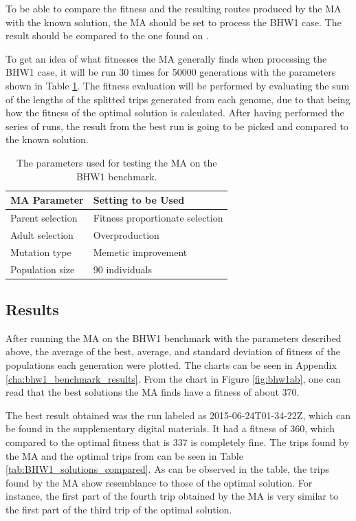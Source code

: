 To be able to compare the fitness and the resulting routes produced by the MA with the known solution, the MA should be set to process the BHW1 case. The result should be compared to the one found on \citet{BHW1Solution}.

To get an idea of what fitnesses the MA generally finds when processing the BHW1 case, it will be run 30 times for 50000 generations with the parameters shown in Table \ref{tab:BHW1_params_table}. The fitness evaluation will be performed by evaluating the sum of the lengths of the splitted trips generated from each genome, due to that being how the fitness of the optimal solution is calculated. After having performed the series of runs, the result from the best run is going to be picked and compared to the known solution.

{
\begin{table}[tbph]
\centering
\begin{tabular}{ll}
\toprule
\textbf{MA Parameter} & \textbf{Setting to be Used}     \\ \midrule
Parent selection      & Fitness proportionate selection \\
Adult selection       & Overproduction                  \\
Mutation type         & Memetic improvement             \\
Population size       & 90 individuals                  \\ \bottomrule
\end{tabular}
\caption{The parameters used for testing the MA on the BHW1 benchmark.}
\label{tab:BHW1_params_table}
\end{table}
}

\subsection{Results}

After running the MA on the BHW1 benchmark with the parameters described above, the average of the best, average, and standard deviation of fitness of the populations each generation were plotted. The charts can be seen in Appendix \ref{cha:bhw1_benchmark_results}. From the chart in Figure \ref{fig:bhw1ab}, one can read that the best solutions the MA finds have a fitness of about 370.

The best result obtained was the run labeled as 2015-06-24T01-34-22Z, which can be found in the supplementary digital materials. It had a fitness of 360, which compared to the optimal fitness that is 337 is completely fine. The trips found by the MA and the optimal trips from \citet{BHW1Solution} can be seen in Table \ref{tab:BHW1_solutions_compared}. As can be observed in the table, the trips found by the MA show resemblance to those of the optimal solution. For instance, the first part of the fourth trip obtained by the MA is very similar to the first part of the third trip of the optimal solution.

